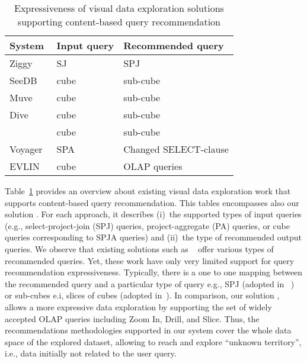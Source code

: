  
 
 \begin{table}[t]
 \centering \scriptsize
 \begin{tabular}{|p{3.5cm}|p{0.9cm}|p{2.9cm}|} \hline
\textbf{System} & \textbf{Input query} & \textbf{Recommended query}  \\ \hline
    Ziggy~\cite{Sellam:16} & SJ & SPJ  \\ \hline
 SeeDB~\cite{Vartak} & cube & sub-cube  \\ \hline
Muve~\cite{Ehsan:18} & cube & sub-cube  \\ \hline
Dive~\cite{MafrurSK18} & cube & sub-cube  \\ \hline
   \cite{Tang:2017} & cube & sub-cube  \\ \hline
Voyager~\cite{Wongsuphasawat2016,Wongsuphasawat:2017} &SPA & Changed SELECT-clause   \\ \hline
 EVLIN~\cite{BHBK18:Demo} & cube & OLAP queries    \\ \hline
\end{tabular}
 \caption{Expressiveness of visual data exploration solutions supporting content-based query recommendation}
  \label{tab:rw2}
 \end{table}



Table~\ref{tab:rw2} provides an overview about existing visual data exploration work that supports content-based query recommendation.
This tables encompasses also our solution \prototype{}.
For each approach, it describes (i)~the supported types of input queries (e.g., select-project-join (SPJ) queries, project-aggregate (PA) queries, or cube queries corresponding to SPJA queries) and (ii)~the type of recommended output queries. 
We observe that existing solutions such as
~\cite{Vartak,Sellam:16,Tang:2017,Wongsuphasawat2016,Wongsuphasawat:2017,MafrurSK18,Ehsan:18} offer various types of recommended queries. Yet, these work have only very limited support for query recommendation expressiveness. 
Typically, there is a one to one mapping between the recommended query and a particular type of query e.g., SPJ (adopted in 
~\cite{Sellam:16}) or sub-cubes e.i, slices of cubes (adopted in~\cite{Vartak,Tang:2017,MafrurSK18,Ehsan:18}). 
In comparison, our solution \prototype{}, allows a more expressive data exploration by supporting the set of widely accepted OLAP queries including Zoom In, Drill, and Slice. Thus, the recommendations methodologies supported in our system cover the whole data space of the explored dataset, allowing to reach and explore ``unknown territory'', i.e., data initially not related to the user query. 
  

 
 
 
 
 
 

